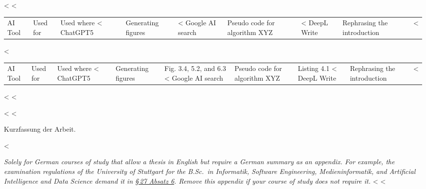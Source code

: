 {{{{{{{{{<%
<%
\begin{tabular}{lll}
  \toprule
  AI Tool          & Used for                      & Used where               <%
  \midrule
  ChatGPT5         & Generating figures            & <%
  Google AI search & Pseudo code for algorithm XYZ & <%
  DeepL Write      & Rephrasing the introduction   & <%
  \bottomrule
\end{tabular}
<%
\begin{tabular}{lll}
  \toprule
  AI Tool          & Used for                      & Used where              <%
  \midrule
  ChatGPT5         & Generating figures            & Fig. 3.4, 5.2, and 6.3  <%
  Google AI search & Pseudo code for algorithm XYZ & Listing 4.1             <%
  DeepL Write      & Rephrasing the introduction   & <%
  \bottomrule
\end{tabular}
<%
<%

<%
<%

\begin{otherlanguage}{ngerman}
  Kurzfassung der Arbeit.
\end{otherlanguage}
<%

\emph{Solely for German courses of study that allow a thesis in English but require a German summary as an appendix.
  For example, the examination regulations of the University of Stuttgart for the B.Sc.\ in Informatik, Software Engineering, Medieninformatik, and Artificial Intelligence and Data Science demand it in
  \href{https://www.uni-stuttgart.de/universitaet/aktuelles/bekanntmachungen/Amtliche-Bekanntmachung-Nummer-26-2025/}{§\,27 Absatz 6}.
  Remove this appendix if your course of study does not require it.}
<%
<%

}}}}}}}}}
